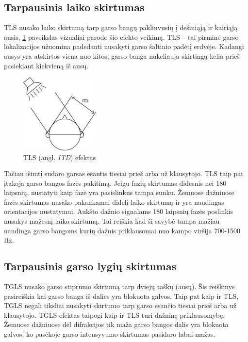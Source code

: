 \documentclass[]{vgtuef}
\begin{document}
\subsection{Tarpausinis laiko skirtumas}

TLS nusako laiko skirtumą tarp garso bangų pakliuvusių į dešiniąją ir kairiąją ausis, \ref{fig:ITD_1} paveikslas vizualiai parodo šio efekto veikimą. TLS – tai pirminė garso lokalizacijos užuomina padedanti nusakyti garso šaltinio padėtį erdvėje. Kadangi ausys yra atskirtos viena nuo kitos, garso banga nukeliauja skirtingą kelia prieš pasiekiant kiekvieną iš ausų.

\begin{figure}[!h]
  \centering
  \includegraphics[width=150px]{img/ITD.jpg}
  \caption{TLS (angl. \textit{ITD}) efektas}
  \label{fig:ITD_1}
\end{figure}

Tačiau išimtį sudaro garsas esantis tiesiai prieš arba už klausytojo. TLS taip pat įtakoja garso bangos fazės  pakitimą. Jeigu fazių skirtumas didesnis nei 180 laipsnių, nustatyti kaip fazė yra pasislinkus tampa sunku. Žemuose dažniuose fazės skirtumas nusako pakankamai didelį laiko skirtumą ir yra naudingas orientacijos nustatymui. Aukšto dažnio signalams 180 laipsnių fazės poslinkis  nusakys mažesnį laiko skirtumą. Tai reiškia kad ši savybė tampa mažiau naudinga garso bangoms kurių dažnis priklausomai nuo kampo viršija 700-1500 Hz.

\subsection{Tarpausinis garso lygių skirtumas}
TGLS nusako garso stiprumo skirtumą tarp dviejų taškų (ausų). Šis reiškinys pasireiškia kai garso banga iš dalies yra blokuota galvos. Taip pat kaip ir TLS, TGLS negali tiksliai nusakyti skirtumo tarp garso esančio tiesiai prieš arba už klausytojo. TGLS efektas taipogi kaip ir TLS turi dažninę priklausomybę. Žemuose dažniuose dėl difrakcijos tik maža garso bangos dalis yra blokuota galvos, ko pasėkoje garso intensyvumo skirtumas pasidaro labai mažas.
\end{document}
